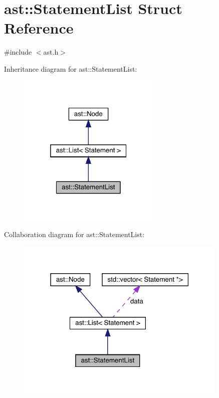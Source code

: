 \hypertarget{structast_1_1_statement_list}{}\section{ast\+:\+:Statement\+List Struct Reference}
\label{structast_1_1_statement_list}


{\ttfamily \#include $<$ast.\+h$>$}



Inheritance diagram for ast\+:\+:Statement\+List\+:
\nopagebreak
\begin{figure}[H]
\begin{center}
\leavevmode
\includegraphics[width=193pt]{structast_1_1_statement_list__inherit__graph}
\end{center}
\end{figure}


Collaboration diagram for ast\+:\+:Statement\+List\+:
\nopagebreak
\begin{figure}[H]
\begin{center}
\leavevmode
\includegraphics[width=286pt]{structast_1_1_statement_list__coll__graph}
\end{center}
\end{figure}
